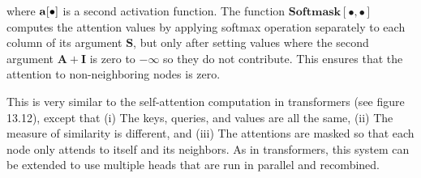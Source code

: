 \documentclass{article}
\begin{document}
where $ \mathbf{a}[\large\bullet] $ is a second activation function.
The function $ \mathbf{Softmask}[\bullet,\bullet] $ computes the attention values by applying softmax
operation separately to each column of its argument $ \mathbf{S} $, but only after setting values where the second
argument $ \mathbf{A} + \mathbf{I} $ is zero to $ -\infty $ so they do not contribute.
This ensures that the attention to non-neighboring nodes is zero.

This is very similar to the self-attention computation in transformers (see figure 13.12), except that 
(i) The keys, queries, and values are all the same, (ii) The measure of similarity is different,
 and (iii)  The attentions are masked so that each node only attends to itself and its neighbors.
 As in transformers, this system can be extended to use multiple heads that are run in parallel and recombined.
\end{document}
